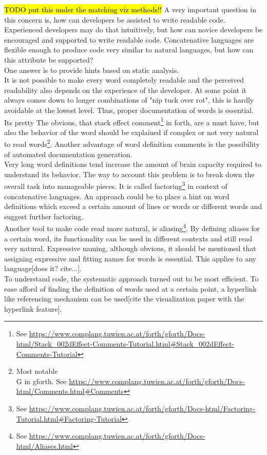 \hl{TODO put this under the matching viz methods!!}
A very important question in this concern is, how can developers be assisted to write readable code. Experienced developers may do that intuitively, but how can novice developers be encouraged and supported to write readable code. Concatenative languages are flexible enough to produce code very similar to natural languages, but how can this attribute be supported?\\
One answer is to provide hints based on static analysis.\\
It is not possible to make every word completely readable and the perceived readability also depends on the experience of the developer. At some point  it always comes down to longer combinations of "nip tuck over rot", this is hardly avoidable at the lowest level. Thus, proper documentation of words is essential. Its pretty The obvious, that stack effect comment\footnote{See \url{https://www.complang.tuwien.ac.at/forth/gforth/Docs-html/Stack\_002dEffect-Comments-Tutorial.html\#Stack\_002dEffect-Comments-Tutorial}} in forth, are a must have, but also the behavior of the word should be explained if complex or not very natural to read words\footnote{Most notable \\G in gforth. See \url{https://www.complang.tuwien.ac.at/forth/gforth/Docs-html/Comments.html\#Comments}}. Another advantage of word definition comments is the possibility of automated documentation generation.\\
Very long word definitions tend increase the amount of brain capacity required to understand its behavior. The way to account this problem is to break down the overall task into manageable pieces. It is called factoring\footnote{See \url{https://www.complang.tuwien.ac.at/forth/gforth/Docs-html/Factoring-Tutorial.html\#Factoring-Tutorial}} in context of concatenative languages. An approach could be to place a hint on word definitions which exceed a certain amount of lines or words or different words and suggest further factoring.\\
Another tool to make code read more natural, is aliasing\footnote{See \url{https://www.complang.tuwien.ac.at/forth/gforth/Docs-html/Aliases.html}}. By defining aliases for a certain word, its functionality can be used in different contexts and still read very natural.
Expressive naming, although obvious, it should be mentioned that assigning expressive and fitting names for words is essential. This applies to any language[does it? cite...].\\
To understand code, the systematic approach turned out to be most efficient\cite{Robillard:2004:EDI:1042203.1042417}. To ease afford of finding the definition of words used at a certain point, a hyperlink like referencing mechanism can be used[cite the visualization paper with the hyperlink feature].\\
